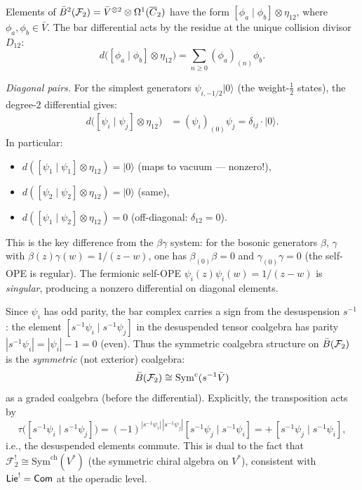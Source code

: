 \begin{computation}
\label{comp:fermion-deg2}
Elements of $\bar{B}^2(\mathcal{F}_2) = \bar{V}^{\otimes 2}
\otimes \Omega^1(\overline{C}_2)$ have the form
$[\phi_a \mid \phi_b] \otimes \eta_{12}$, where $\phi_a, \phi_b \in \bar{V}$.
The bar differential acts by the residue at the unique collision divisor $D_{12}$:
\begin{equation}\label{eq:fermion-bar-d2}
d\bigl([\phi_a \mid \phi_b] \otimes \eta_{12}\bigr)
= \sum_{n \geq 0} (\phi_a)_{(n)}\phi_b.
\end{equation}

\emph{Diagonal pairs.}
For the simplest generators $\psi_{i,-1/2}|0\rangle$ (the weight-$\frac{1}{2}$
states), the degree-2 differential gives:
\begin{align}
d\bigl([\psi_i \mid \psi_j] \otimes \eta_{12}\bigr)
&= (\psi_i)_{(0)}\psi_j = \delta_{ij}\cdot |0\rangle.
\label{eq:fermion-d2-simple}
\end{align}
In particular:
\begin{itemize}
\item $d([\psi_1 \mid \psi_1] \otimes \eta_{12}) = |0\rangle$
  \quad (maps to vacuum --- nonzero!),
\item $d([\psi_2 \mid \psi_2] \otimes \eta_{12}) = |0\rangle$
  \quad (same),
\item $d([\psi_1 \mid \psi_2] \otimes \eta_{12}) = 0$
  \quad (off-diagonal: $\delta_{12} = 0$).
\end{itemize}

This is the key difference from the $\beta\gamma$ system: for the
bosonic generators $\beta$, $\gamma$ with $\beta(z)\gamma(w) = 1/(z-w)$,
one has $\beta_{(0)}\beta = 0$ and $\gamma_{(0)}\gamma = 0$
(the self-OPE is regular).  The fermionic self-OPE
$\psi_i(z)\psi_i(w) = 1/(z-w)$ is \emph{singular}, producing a
nonzero differential on diagonal elements.
\end{computation}

\begin{computation}
\label{comp:fermion-deg2-signs}
Since $\psi_i$ has odd parity, the bar complex carries a
sign from the desuspension $s^{-1}$:
the element $[s^{-1}\psi_i \mid s^{-1}\psi_j]$ in the
desuspended tensor coalgebra has parity $|s^{-1}\psi_i| = |\psi_i| - 1 = 0$
(even).  Thus the symmetric coalgebra structure on $\bar{B}(\mathcal{F}_2)$
is the \emph{symmetric} (not exterior) coalgebra:
\[
\bar{B}(\mathcal{F}_2) \cong \mathrm{Sym}^c(s^{-1}\bar{V})
\]
as a graded coalgebra (before the differential).
Explicitly, the transposition acts by
\[
\tau\bigl([s^{-1}\psi_i \mid s^{-1}\psi_j]\bigr)
= (-1)^{|s^{-1}\psi_i|\,|s^{-1}\psi_j|}
  [s^{-1}\psi_j \mid s^{-1}\psi_i]
= +\,[s^{-1}\psi_j \mid s^{-1}\psi_i],
\]
i.e., the desuspended elements commute.  This is dual to the
fact that $\mathcal{F}_2^! \cong \mathrm{Sym}^{\mathrm{ch}}(V^*)$
(the symmetric chiral algebra on $V^*$), consistent with
$\mathsf{Lie}^! = \mathsf{Com}$ at the operadic level.
\end{computation}

